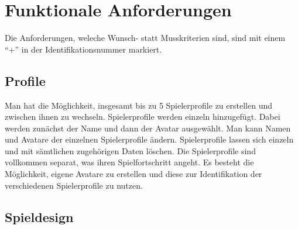 \section{Funktionale Anforderungen}

Die Anforderungen, weleche Wunsch- statt Musskriterien sind, sind mit einem "`+"' in der Identifikationsnummer markiert.

\subsection{Profile}

\begin{requirements}
	Man hat die Möglichkeit, insgesamt bis zu 5 Spielerprofile zu erstellen und zwischen ihnen zu wechseln.
	 Spielerprofile werden einzeln hinzugefügt. Dabei werden zunächst der Name und dann der Avatar ausgewählt.
	 Man kann Namen und Avatare der einzelnen Spielerprofile ändern.
	 Spielerprofile lassen sich einzeln und mit sämtlichen zugehörigen Daten löschen.
	Die Spielerprofile sind vollkommen separat, was ihren Spielfortschritt angeht.
	Es besteht die Möglichkeit, eigene Avatare zu erstellen und diese zur Identifikation der verschiedenen Spielerprofile zu nutzen.
\end{requirements}

\subsection{Spieldesign}

